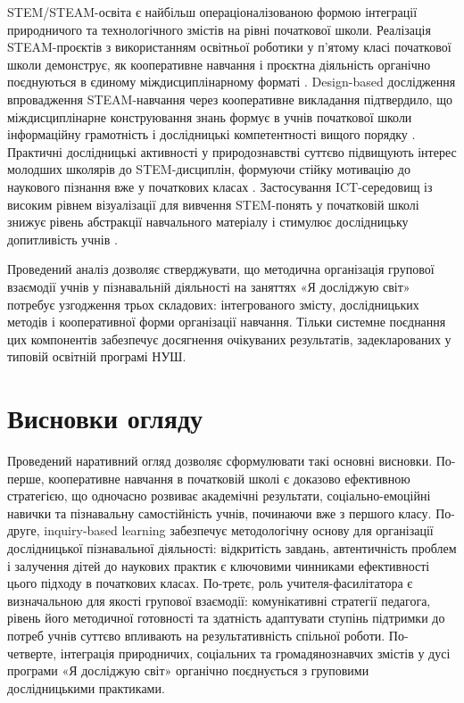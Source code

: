 \documentclass[a4paper,12pt]{article}
\begin{document}
STEM/STEAM-освіта є найбільш операціоналізованою формою інтеграції природничого та технологічного змістів на рівні початкової школи. Реалізація STEAM-проєктів з використанням освітньої роботики у п'ятому класі початкової школи демонструє, як кооперативне навчання і проєктна діяльність органічно поєднуються в єдиному міждисциплінарному форматі \parencite{Vicente20201}. Design-based дослідження впровадження STEAM-навчання через кооперативне викладання підтвердило, що міждисциплінарне конструювання знань формує в учнів початкової школи інформаційну грамотність і дослідницькі компетентності вищого порядку \parencite{Li2022}. Практичні дослідницькі активності у природознавстві суттєво підвищують інтерес молодших школярів до STEM-дисциплін, формуючи стійку мотивацію до наукового пізнання вже у початкових класах \parencite{Ribarić2025}. Застосування ICT-середовищ із високим рівнем візуалізації для вивчення STEM-понять у початковій школі знижує рівень абстракції навчального матеріалу і стимулює дослідницьку допитливість учнів \parencite{Fanchamps2023102}.

Проведений аналіз дозволяє стверджувати, що методична організація групової взаємодії учнів у пізнавальній діяльності на заняттях «Я досліджую світ» потребує узгодження трьох складових: інтегрованого змісту, дослідницьких методів і кооперативної форми організації навчання. Тільки системне поєднання цих компонентів забезпечує досягнення очікуваних результатів, задекларованих у типовій освітній програмі НУШ.

\newpage


\section*{Висновки огляду}

Проведений наративний огляд дозволяє сформулювати такі основні висновки. По-перше, кооперативне навчання в початковій школі є доказово ефективною стратегією, що одночасно розвиває академічні результати, соціально-емоційні навички та пізнавальну самостійність учнів, починаючи вже з першого класу. По-друге, inquiry-based learning забезпечує методологічну основу для організації дослідницької пізнавальної діяльності: відкритість завдань, автентичність проблем і залучення дітей до наукових практик є ключовими чинниками ефективності цього підходу в початкових класах. По-третє, роль учителя-фасилітатора є визначальною для якості групової взаємодії: комунікативні стратегії педагога, рівень його методичної готовності та здатність адаптувати ступінь підтримки до потреб учнів суттєво впливають на результативність спільної роботи. По-четверте, інтеграція природничих, соціальних та громадянознавчих змістів у дусі програми «Я досліджую світ» органічно поєднується з груповими дослідницькими практиками.
\end{document}
